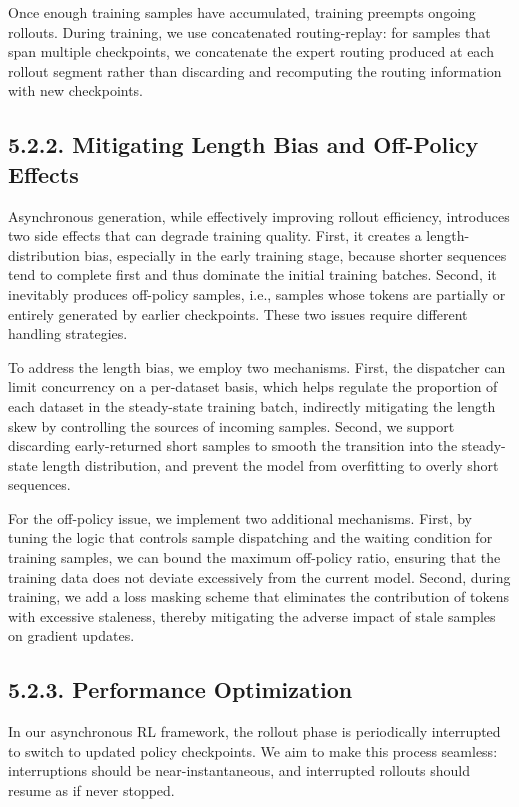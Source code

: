 \documentclass[
  10
]{article}
\begin{document}
Once enough training samples have accumulated, training preempts ongoing
rollouts. During training, we use concatenated routing-replay: for
samples that span multiple checkpoints, we concatenate the expert
routing produced at each rollout segment rather than discarding and
recomputing the routing information with new checkpoints.

\subsection{5.2.2. Mitigating Length Bias and Off-Policy
Effects}\label{mitigating-length-bias-and-off-policy-effects}

Asynchronous generation, while effectively improving rollout efficiency,
introduces two side effects that can degrade training quality. First, it
creates a length-distribution bias, especially in the early training
stage, because shorter sequences tend to complete first and thus
dominate the initial training batches. Second, it inevitably produces
off-policy samples, i.e., samples whose tokens are partially or entirely
generated by earlier checkpoints. These two issues require different
handling strategies.

To address the length bias, we employ two mechanisms. First, the
dispatcher can limit concurrency on a per-dataset basis, which helps
regulate the proportion of each dataset in the steady-state training
batch, indirectly mitigating the length skew by controlling the sources
of incoming samples. Second, we support discarding early-returned short
samples to smooth the transition into the steady-state length
distribution, and prevent the model from overfitting to overly short
sequences.

For the off-policy issue, we implement two additional mechanisms. First,
by tuning the logic that controls sample dispatching and the waiting
condition for training samples, we can bound the maximum off-policy
ratio, ensuring that the training data does not deviate excessively from
the current model. Second, during training, we add a loss masking scheme
that eliminates the contribution of tokens with excessive staleness,
thereby mitigating the adverse impact of stale samples on gradient
updates.

\subsection{5.2.3. Performance
Optimization}\label{performance-optimization}

In our asynchronous RL framework, the rollout phase is periodically
interrupted to switch to updated policy checkpoints. We aim to make this
process seamless: interruptions should be near-instantaneous, and
interrupted rollouts should resume as if never stopped.
\end{document}
